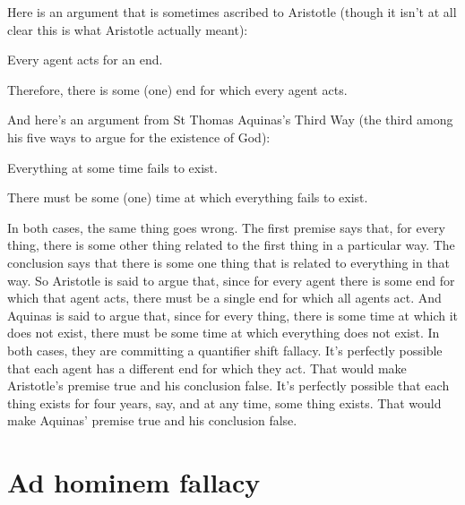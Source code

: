 Here is an argument that is sometimes ascribed to Aristotle (though it isn't at all clear this is what Aristotle actually meant):
\begin{earg}
\prem Every agent acts for an end.

\conc Therefore, there is some (one) end for which every agent acts.
\end{earg}
And here's an argument from St Thomas Aquinas's Third Way (the third among his five ways to argue for the existence of God):
\begin{earg}
\prem Everything at some time fails to exist.

\conc There must be some (one) time at which everything fails to exist.
\end{earg}
In both cases, the same thing goes wrong. The first premise says that, for every thing, there is some other thing related to the first thing in a particular way. The conclusion says that there is some one thing that is related to everything in that way. So Aristotle is said to argue that, since for every agent there is some end for which that agent acts, there must be a single end for which all agents act. And Aquinas is said to argue that, since for every thing, there is some time at which it does not exist, there must be some time at which everything does not exist. In both cases, they are committing a quantifier shift fallacy. It's perfectly possible that each agent has a different end for which they act. That would make Aristotle's premise true and his conclusion false. It's perfectly possible that each thing exists for four years, say, and at any time, some thing exists. That would make Aquinas' premise true and his conclusion false.

\section{Ad hominem fallacy}

